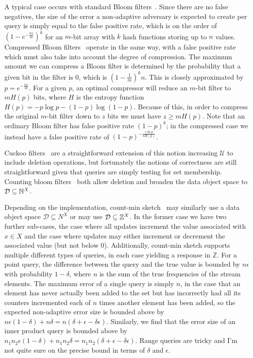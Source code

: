 A typical case occurs with standard Bloom filters~\cite{bloomfilter}. Since there are no false negatives, the size of the error a non-adaptive adversary is expected to create per query is simply equal to the false positive rate, which is on the order of $(1-e^{-\frac{kn}{m}})^k$ for an $m$-bit array with $k$ hash functions storing up to $n$ values. Compressed Bloom filters~\cite{xxx} operate in the same way, with a false positive rate which must also take into account the degree of compression. The maximum amount we can compress a Bloom filter is determined by the probability that a given bit in the filter is 0, which is $\left(1-\frac{1}{m}\right)^kn$. This is closely approximated by $p = e^{-\frac{kn}{m}}$. For a given $p$, an optimal compressor will reduce an $m$-bit filter to $mH(p)$ bits, where $H$ is the entropy function $H(p) = -p\log p - (1-p)\log(1-p)$. Because of this, in order to compress the original $m$-bit filter down to $z$ bits we must have $z \ge mH(p)$. Note that an ordinary Bloom filter has false positive rate $(1-p)^k$; in the compressed case we instead have a false positive rate of $(1-p)^{-\frac{z \ln p}{nH(p)}}$.

Cuckoo filters~\cite{xxx} are a straightforward extension of this notion increasing $\mathcal{U}$ to include deletion operations, but fortunately the notions of correctness are still straightforward given that queries are simply testing for set membership. Counting bloom filters~\cite{xxx} both allow deletion and broaden the data object space to $\mathcal{D} \subseteq \mathbb{N}^X$.

Depending on the implementation, count-min sketch~\cite{xxx} may similarly use a data object space $\mathcal{D} \subseteq N^X$ or may use $\mathcal{D} \subseteq \mathbb{Z}^X$. In the former case we have two further sub-cases, the case where all updates increment the value associated with $x \in X$ and the case where updates may either increment or decrement the associated value (but not below 0). Additionally, count-min sketch supports multiple different types of queries, in each case yielding a response in $\mathbb{Z}$. For a point query, the difference between the query and the true value is bounded by $n\epsilon$ with probability $1-\delta$, where $n$ is the sum of the true frequencies of the stream elements. The maximum error of a single query is simply $n$, in the case that an element has never actually been added to the set but has incorrectly had all its counters incremented each of $n$ times another element has been added, so the expected non-adaptive error size is bounded above by $n\epsilon(1-\delta)+n\delta = n(\delta+\epsilon-\delta\epsilon)$.  Similarly, we find that the error size of an inner product query is bounded above by $n_1n_2\epsilon(1-\delta)+n_1n_2\delta = n_1n_2(\delta+\epsilon-\delta\epsilon)$. Range queries are tricky and I'm not quite sure on the precise bound in terms of $\delta$ and $\epsilon$.

